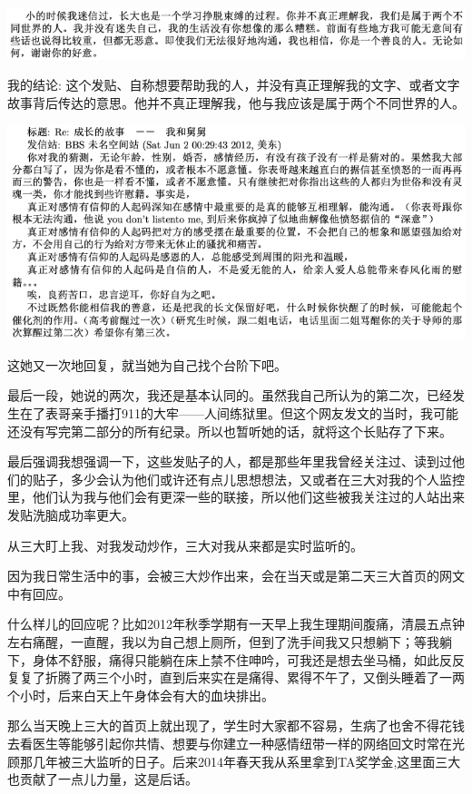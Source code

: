 \documentclass[9pt, b5paper]{article}
\begin{document}
\begin{center}
\includegraphics[width=.9\linewidth]{./pic/p1p115-2.png}
\end{center}

我的结论: 这个发贴、自称想要帮助我的人，并没有真正理解我的文字、或者文字故事背后传达的意思。他并不真正理解我，他与我应该是属于两个不同世界的人。

\begin{center}
\includegraphics[width=.9\linewidth]{./pic/p1p115-3.png}
\end{center}

这她又一次地回复，就当她为自己找个台阶下吧。

最后一段，她说的两次，我还是基本认同的。虽然我自己所认为的第二次，已经发生在了表哥亲手播打911的大牢——人间练狱里。但这个网友发文的当时，我可能还没有写完第二部分的所有纪录。所以也暂听她的话，就将这个长贴存了下来。 

最后强调我想强调一下，这些发贴子的人，都是那些年里我曾经关注过、读到过他们的贴子，多少会认为他们或许还有点儿思想想法，又或者在三大对我的个人监控里，他们认为我与他们会有更深一些的联接，所以他们这些被我关注过的人站出来发贴洗脑成功率更大。

从三大盯上我、对我发动炒作，三大对我从来都是实时监听的。

因为我日常生活中的事，会被三大炒作出来，会在当天或是第二天三大首页的网文中有回应。

什么样儿的回应呢？比如2012年秋季学期有一天早上我生理期间腹痛，清晨五点钟左右痛醒，一直醒，我以为自己想上厕所，但到了洗手间我又只想躺下；等我躺下，身体不舒服，痛得只能躺在床上禁不住呻吟，可我还是想去坐马桶，如此反反复复了折腾了两三个小时，直到后来实在是痛得、累得不午了，又倒头睡着了一两个小时，后来白天上午身体会有大的血块排出。

那么当天晚上三大的首页上就出现了，学生时大家都不容易，生病了也舍不得花钱去看医生等能够引起你共情、想要与你建立一种感情纽带一样的网络回文时常在光顾那几年被三大监听的日子。后来2014年春天我从系里拿到TA奖学金,这里面三大也贡献了一点儿力量，这是后话。 
\end{document}
